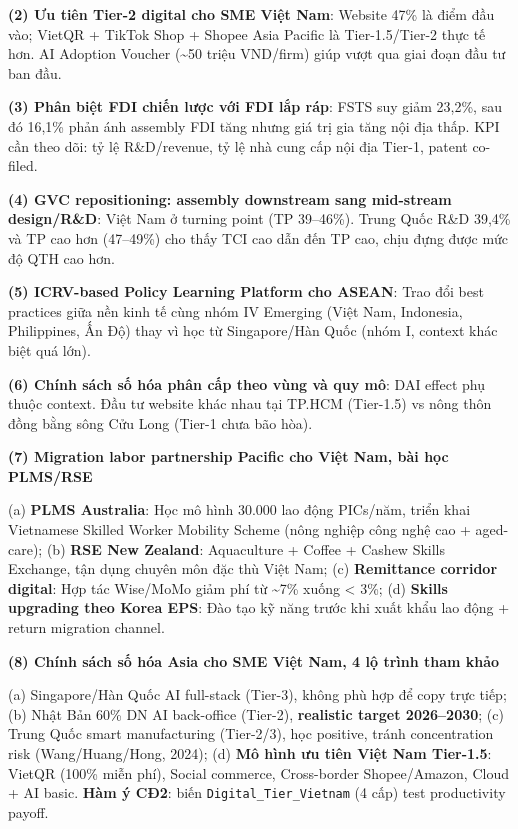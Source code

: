 \documentclass[12pt,a4paper]{article}
\begin{document}
\textbf{(2) Ưu tiên Tier-2 digital cho SME Việt Nam}: Website 47\% là
điểm đầu vào; VietQR + TikTok Shop + Shopee Asia Pacific là
Tier-1.5/Tier-2 thực tế hơn. AI Adoption Voucher (\textasciitilde50
triệu VND/firm) giúp vượt qua giai đoạn đầu tư ban đầu.

\textbf{(3) Phân biệt FDI chiến lược với FDI lắp ráp}: FSTS suy giảm
23,2\%, sau đó 16,1\% phản ánh assembly FDI tăng nhưng giá trị gia tăng
nội địa thấp. KPI cần theo dõi: tỷ lệ R\&D/revenue, tỷ lệ nhà cung cấp
nội địa Tier-1, patent co-filed.

\textbf{(4) GVC repositioning: assembly downstream sang mid-stream
design/R\&D}: Việt Nam ở turning point (TP 39--46\%). Trung Quốc R\&D
39,4\% và TP cao hơn (47--49\%) cho thấy TCI cao dẫn đến TP cao, chịu
đựng được mức độ QTH cao hơn.

\textbf{(5) ICRV-based Policy Learning Platform cho ASEAN}: Trao đổi
best practices giữa nền kinh tế cùng nhóm IV Emerging (Việt Nam,
Indonesia, Philippines, Ấn Độ) thay vì học từ Singapore/Hàn Quốc (nhóm
I, context khác biệt quá lớn).

\textbf{(6) Chính sách số hóa phân cấp theo vùng và quy mô}: DAI effect
phụ thuộc context. Đầu tư website khác nhau tại TP.HCM (Tier-1.5) vs
nông thôn đồng bằng sông Cửu Long (Tier-1 chưa bão hòa).

\textbf{(7) Migration labor partnership Pacific cho Việt Nam, bài học
PLMS/RSE}

(a) \textbf{PLMS Australia}: Học mô hình 30.000 lao động PICs/năm, triển
khai Vietnamese Skilled Worker Mobility Scheme (nông nghiệp công nghệ
cao + aged-care); (b) \textbf{RSE New Zealand}: Aquaculture + Coffee +
Cashew Skills Exchange, tận dụng chuyên môn đặc thù Việt Nam; (c)
\textbf{Remittance corridor digital}: Hợp tác Wise/MoMo giảm phí từ
\textasciitilde7\% xuống \textless{} 3\%; (d) \textbf{Skills upgrading
theo Korea EPS}: Đào tạo kỹ năng trước khi xuất khẩu lao động + return
migration channel.

\textbf{(8) Chính sách số hóa Asia cho SME Việt Nam, 4 lộ trình tham
khảo}

(a) Singapore/Hàn Quốc AI full-stack (Tier-3), không phù hợp để copy
trực tiếp; (b) Nhật Bản 60\% DN AI back-office (Tier-2),
\textbf{realistic target 2026--2030}; (c) Trung Quốc smart manufacturing
(Tier-2/3), học positive, tránh concentration risk (Wang/Huang/Hong,
2024); (d) \textbf{Mô hình ưu tiên Việt Nam Tier-1.5}: VietQR (100\%
miễn phí), Social commerce, Cross-border Shopee/Amazon, Cloud + AI
basic. \textbf{Hàm ý CĐ2}: biến \texttt{Digital\_Tier\_Vietnam} (4 cấp)
test productivity payoff.
\end{document}
